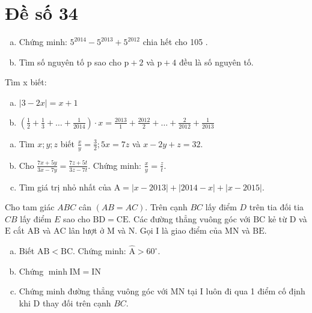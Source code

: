 \onehalfspacing
\section{Đề số 34}

\begin{bt} 
	\hfill
	\begin{enumerate}[a.]
		\item Chứng minh: $5^{2014}-5^{2013}+5^{2012}$ chia hết cho 105 .
		\item Tìm số nguyên tố $\mathrm{p}$ sao cho $\mathrm{p}+2$ và $\mathrm{p}+4$ đều là số nguyên tố.
	\end{enumerate}
	\loigiai{} 
\end{bt}

\begin{bt}
	Tìm x biết:
	\begin{enumerate}[a.]
		\item $|3-2 x|=x+1$
		\item $\left(\frac{1}{2}+\frac{1}{3}+\ldots+\frac{1}{2014}\right) \cdot x=\frac{2013}{1}+\frac{2012}{2}+\ldots+\frac{2}{2012}+\frac{1}{2013}$
	\end{enumerate}
	\loigiai{} 
\end{bt}

\begin{bt}
	\hfill 
	\begin{enumerate}[a.]
		\item Tìm $x ; y ; z$ biết $\frac{x}{y}=\frac{3}{2} ; 5 x=7 z$ và $x-2 y+z=32$.
		\item Cho $\frac{7 x+5 y}{3 x-7 y}=\frac{7 z+5 t}{3 z-7 t}$. Chứng minh: $\frac{x}{y}=\frac{z}{t}$.
		\item Tìm giá trị nhỏ nhất của $\mathrm{A}=|x-2013|+|2014-x|+|x-2015|$.
	\end{enumerate}
	\loigiai{} 
\end{bt}

\begin{bt}
	Cho tam giác $A B C$ cân $(A B=A C)$. Trên cạnh $B C$ lấy điểm $D$ trên tia đối tia $C B$ lấy điểm $E$ sao cho $\mathrm{BD}=\mathrm{CE}$. Các đường thẳng vuông góc với $\mathrm{BC}$ kẻ từ $\mathrm{D}$ và $\mathrm{E}$ cắt $\mathrm{AB}$ và $\mathrm{AC}$ lân lượt ở $\mathrm{M}$ và N. Gọi I là giao điểm của $\mathrm{MN}$ và $\mathrm{BE}$.
	\begin{enumerate}[a.]
		\item Biết $\mathrm{AB}<\mathrm{BC}$. Chứng minh: $\hat{\mathrm{A}}>60^{\circ}$.
		\item Chứng $\operatorname{minh} \mathrm{IM}=\mathrm{IN}$
		\item Chứng minh đường thẳng vuông góc với $\mathrm{MN}$ tại I luôn đi qua 1 điểm cố định khi $\mathrm{D}$ thay đối trên cạnh $B C$.
	\end{enumerate}
	\loigiai{}
\end{bt}